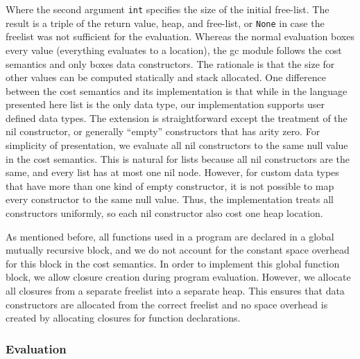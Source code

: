 \documentclass{easychair}
\theoremstyle{definition}
\begin{document}
Where the second argument \texttt{int} specifies the size of the initial free-list.
The result is a triple of the return value, heap, and free-list, or \texttt{None} 
in case the freelist was not sufficient for the evaluation.
Whereas the normal evaluation boxes every value (everything evaluates to a location), 
the gc module follows the cost semantics and only boxes data constructors. The rationale is
that the size for other values can be computed statically and stack allocated. One difference
between the cost semantics and its implementation is that while in the language presented here
list is the only data type, our implementation supports user defined data types. The extension
is straightforward except the treatment of the nil constructor, or generally ``empty'' constructors
that has arity zero. For simplicity of presentation, we evaluate all nil constructors to
the same null value in the cost semantics. This is natural for lists because all nil constructors 
are the same, and every list has at most one nil node. However, for custom data types that have 
more than one kind of empty constructor, it is not possible to map every constructor to the same 
null value. Thus, the implementation treats all constructors uniformly, so each nil constructor
also cost one heap location. 

As mentioned before, all functions used in a program are declared in a global mutually 
recursive block, and we do not account for the constant space overhead for this block in 
the cost semantics.  In order to implement this global function block, we allow closure creation
during program evaluation. However, we allocate all closures from a separate freelist into 
a separate heap.  This ensures that data constructors are allocated from the correct freelist 
and no space overhead is created by allocating closures for function declarations.

\subsubsection{Evaluation}
\label{sect:evaluation}
\end{document}
